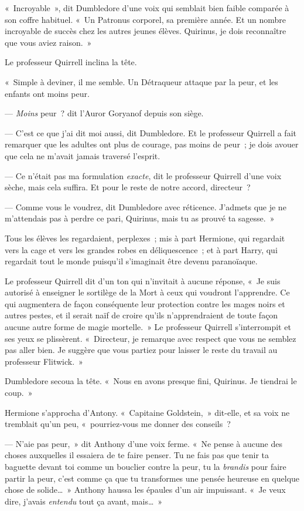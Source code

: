 «~Incroyable~», dit Dumbledore d'une voix qui semblait bien faible comparée à son coffre habituel. «~Un Patronus corporel, sa première année. Et un nombre incroyable de succès chez les autres jeunes élèves. Quirinus, je dois reconnaître que vous aviez raison.~»

Le professeur Quirrell inclina la tête.

«~Simple à deviner, il me semble. Un Détraqueur attaque par la peur, et les enfants ont moins peur.

--- \emph{Moins} peur~? dit l'Auror Goryanof depuis son siège.

--- C'est ce que j'ai dit moi aussi, dit Dumbledore. Et le professeur Quirrell a fait remarquer que les adultes ont plus de courage, pas moins de peur~; je dois avouer que cela ne m'avait jamais traversé l'esprit.

--- Ce n'était pas ma formulation \emph{exacte}, dit le professeur Quirrell d'une voix sèche, mais cela suffira. Et pour le reste de notre accord, directeur~?

--- Comme vous le voudrez, dit Dumbledore avec réticence. J'admets que je ne m'attendais pas à perdre ce pari, Quirinus, mais tu as prouvé ta sagesse.~»

Tous les élèves les regardaient, perplexes~; mis à part Hermione, qui regardait vers la cage et vers les grandes robes en déliquescence~; et à part Harry, qui regardait tout le monde puisqu'il s'imaginait être devenu paranoïaque.

Le professeur Quirrell dit d'un ton qui n'invitait à aucune réponse, «~Je suis autorisé à enseigner le sortilège de la Mort à ceux qui voudront l'apprendre. Ce qui augmentera de façon conséquente leur protection contre les mages noirs et autres pestes, et il serait naïf de croire qu'ils n'apprendraient de toute façon aucune autre forme de magie mortelle.~» Le professeur Quirrell s'interrompit et ses yeux se plissèrent. «~Directeur, je remarque avec respect que vous ne semblez pas aller bien. Je suggère que vous partiez pour laisser le reste du travail au professeur Flitwick.~»

Dumbledore secoua la tête. «~Nous en avons presque fini, Quirinus. Je tiendrai le coup.~»

Hermione s'approcha d'Antony. «~Capitaine Goldstein,~» dit-elle, et sa voix ne tremblait qu'un peu, «~pourriez-vous me donner des conseils~?

--- N'aie pas peur,~» dit Anthony d'une voix ferme. «~Ne pense à aucune des choses auxquelles il essaiera de te faire penser. Tu ne fais pas que tenir ta baguette devant toi comme un bouclier contre la peur, tu la \emph{brandis} pour faire partir la peur, c'est comme ça que tu transformes une pensée heureuse en quelque chose de solide…~» Anthony haussa les épaules d'un air impuissant. «~Je veux dire, j'avais \emph{entendu} tout ça avant, mais…~»

